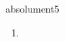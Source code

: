 \documentclass[../templates/main.tex]{subfiles}
\begin{document}
\begin{word}{absolument}{}{5}\label{wo:absolument}
	\begin{enumerate}[label=(\arabic*)]
		\item
	\end{enumerate}
\end{word}
\end{document}
